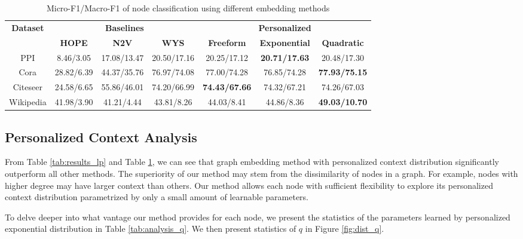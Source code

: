 \documentclass{article}
\begin{document}
\begin{table}
\caption{Micro-F1/Macro-F1 of node classification using different embedding methods}
\label{tab:results_nc}
\centering
\begin{tabular}{cccc|ccc}
\toprule
\multirow{2}{*}{\textbf{Dataset}} & \multicolumn{3}{c}{\textbf{Baselines}} & \multicolumn{3}{c}{\textbf{Personalized}} \\
 & \textbf{HOPE}  & \textbf{N2V} & \textbf{WYS} & \textbf{Freeform} & \textbf{Exponential} & \textbf{Quadratic}\\
\midrule
PPI & 8.46/3.05 & 17.08/13.47  & 20.50/17.16 & 20.25/17.12 & \textbf{20.71/17.63} & 20.48/17.30\\
Cora & 28.82/6.39 & 44.37/35.76  & 76.97/74.08 & 77.00/74.28 & 76.85/74.28 & \textbf{77.93/75.15}\\
Citeseer & 24.58/6.65  & 55.86/46.01 & 74.20/66.99 & \textbf{74.43/67.66} & 74.32/67.21 & 74.26/67.03\\
Wikipedia & 41.98/3.90  & 41.21/4.44 & 43.81/8.26 & 44.03/8.41 & 44.86/8.36 & \textbf{49.03/10.70}\\

\bottomrule
\end{tabular}
\end{table}


\subsection{Personalized Context Analysis}

From Table \ref{tab:results_lp} and Table \ref{tab:results_nc}, we can see that graph embedding method with personalized context distribution significantly outperform all other methods. The superiority of our method may stem from the dissimilarity of nodes in a graph. For example, nodes with higher degree may have larger context than others. Our method allows each node with sufficient flexibility to explore its personalized context distribution parametrized by only a small amount of learnable parameters.

To delve deeper into what vantage our method provides for each node, we present the statistics of the parameters learned by personalized exponential distribution
in Table \ref{tab:analysis_q}. We then present statistics of $q$ in Figure \ref{fig:dist_q}.
\end{document}
